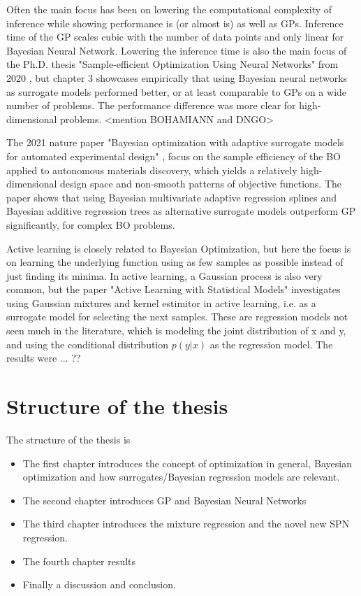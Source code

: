 Often the main focus has been on lowering the computational complexity of inference while
showing performance is (or almost is) as well as GPs. Inference time of the GP scales cubic with the
number of data points and only linear for Bayesian Neural Network. Lowering the inference time is also the
main focus of the Ph.D. thesis "Sample-efficient Optimization Using Neural Networks" from 2020
\cite{PhDthesis}, but chapter 3 showcases empirically that using Bayesian neural networks as
surrogate models performed better, or at least comparable to GPs on a wide number of
problems. The performance difference was more clear for high-dimensional problems. 
<mention BOHAMIANN and DNGO>

The 2021 nature paper "Bayesian optimization with adaptive surrogate models for automated experimental design"
\cite{Nature_BO_paper}, focus on the sample efficiency of the BO applied to autonomous materials discovery, 
which yields a relatively high-dimensional design space and non-smooth patterns of objective functions.  
The paper shows that using Bayesian multivariate adaptive regression splines
and Bayesian additive regression trees as alternative surrogate models outperform GP significantly, 
for complex BO problems. 

Active learning is closely related to Bayesian Optimization, but here the focus is on learning the underlying function
using as few samples as possible instead of just finding its minima. 
In active learning, a Gaussian process is also very common, but the paper "Active Learning with Statistical Models" \cite{ALStatisticalModels}
investigates using Gaussian mixtures and kernel estimitor in active learning, i.e. as a surrogate model for selecting
the next samples. These are regression models not seen much in the literature, which
is modeling the joint distribution of x and y, and using the conditional distribution $p(y|x)$
as the regression model. The results were ... ??

\section{Structure of the thesis}
The structure of the thesis is
\begin{itemize}
    \item The first chapter introduces the concept of optimization in general, Bayesian optimization 
    and how surrogates/Bayesian regression models are relevant.
    \item The second chapter introduces GP and Bayesian Neural Networks
    \item The third chapter introduces the mixture regression and the novel new SPN regression.
    \item The fourth chapter results
    \item Finally a discussion and conclusion.
\end{itemize}



